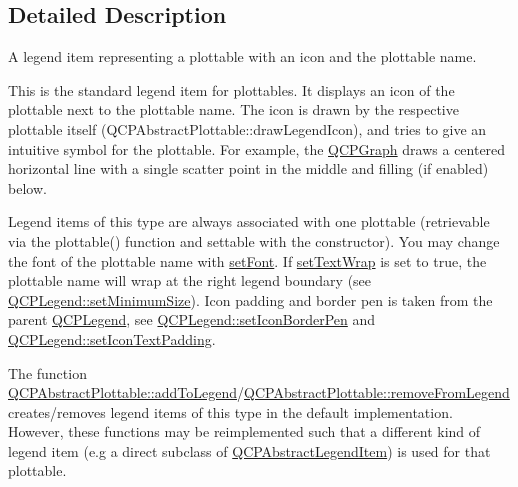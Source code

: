 \subsection{Detailed Description}
A legend item representing a plottable with an icon and the plottable name. 

This is the standard legend item for plottables. It displays an icon of the plottable next to the plottable name. The icon is drawn by the respective plottable itself (Q\-C\-P\-Abstract\-Plottable\-::draw\-Legend\-Icon), and tries to give an intuitive symbol for the plottable. For example, the \hyperlink{classQCPGraph}{Q\-C\-P\-Graph} draws a centered horizontal line with a single scatter point in the middle and filling (if enabled) below.

Legend items of this type are always associated with one plottable (retrievable via the plottable() function and settable with the constructor). You may change the font of the plottable name with \hyperlink{classQCPAbstractLegendItem_a409c53455d8112f71d70c0c43eb10265}{set\-Font}. If \hyperlink{classQCPPlottableLegendItem_ad5155ff022427947dc5c015cbf8e28b7}{set\-Text\-Wrap} is set to true, the plottable name will wrap at the right legend boundary (see \hyperlink{classQCPLegend_a012c09cb070eabe01cfb598ab188a4fc}{Q\-C\-P\-Legend\-::set\-Minimum\-Size}). Icon padding and border pen is taken from the parent \hyperlink{classQCPLegend}{Q\-C\-P\-Legend}, see \hyperlink{classQCPLegend_a2f2c93d18a651f4ff294bb3f026f49b8}{Q\-C\-P\-Legend\-::set\-Icon\-Border\-Pen} and \hyperlink{classQCPLegend_a62973bd69d5155e8ea3141366e8968f6}{Q\-C\-P\-Legend\-::set\-Icon\-Text\-Padding}.

The function \hyperlink{classQCPAbstractPlottable_a70f8cabfd808f7d5204b9f18c45c13f5}{Q\-C\-P\-Abstract\-Plottable\-::add\-To\-Legend}/\hyperlink{classQCPAbstractPlottable_aa1f350e510326d012b9a9c9249736c83}{Q\-C\-P\-Abstract\-Plottable\-::remove\-From\-Legend} creates/removes legend items of this type in the default implementation. However, these functions may be reimplemented such that a different kind of legend item (e.\-g a direct subclass of \hyperlink{classQCPAbstractLegendItem}{Q\-C\-P\-Abstract\-Legend\-Item}) is used for that plottable. 

